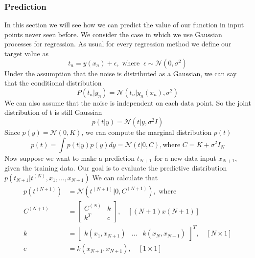 \documentclass[../main.tex]{subfiles}
\begin{document}
\subsubsection{Prediction}
In this section we will see how we can predict the value of our function in input points never seen before. We consider the case in which we use Gaussian processes for regression. As usual for every regression method we define our target value as
\begin{equation*}
    t_n = y(x_n) + \epsilon,\text{ where } \ \epsilon \sim \mathcal{N}(0, \sigma^2)
\end{equation*}
Under the assumption that the noise is distributed as a Gaussian, we can say that the conditional distribution
\begin{equation}
    P(t_n|y_n) = \mathcal{N}(t_n|y_n(x_n), \sigma^2)
\end{equation}
We can also assume that the noise is independent on each data point. So the joint distribution of t is still Gaussian
\begin{equation}
    p(t|y) = \mathcal{N}(t|y, \sigma^2 I)
\end{equation}
Since $p(y)=\mathcal{N}(0, K)$, we can compute the marginal distribution $p(t)$
\begin{equation}
    p(t) = \int p(t|y)p(y)dy = \mathcal{N}(t|0,C),\text{where } C = K + \sigma^2 I_N
\end{equation}
Now suppose we want to make a prediction $t_{N+1}$ for a new data input $x_{N+1}$, given the training data. Our goal is to evaluate the predictive distribution $p(t_{N+1}|t^{(N)},x_1,\dots,x_{N+1})$\footnotemark {}
We can calculate that
\begin{align*}
    p(t^{(N+1)}) & = \mathcal{N}(t^{(N+1)}|0,C^{(N+1)}), \text{ where}                                             \\
    C^{(N+1)}    & =
    \begin{bmatrix}
        C^{(N)} & k \\
        k^T     & c
    \end{bmatrix}, \quad [(N+1) x (N+1)]                                                                           \\
    k            & = \begin{bmatrix} k(x_1, x_{N+1}) & \dots & k(x_N, x_{N+1}) \end{bmatrix}^T, \quad [N \times 1] \\
    c            & = k(x_{N+1},x_{N+1}), \quad [1 \times 1]
\end{align*}
\end{document}
